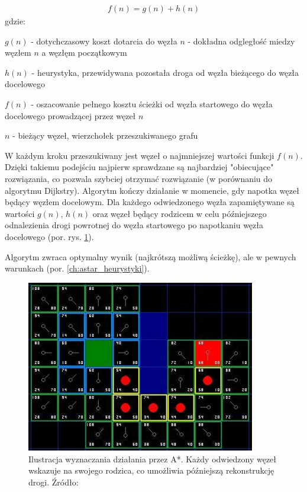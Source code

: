 \begin{gather}
 	f(n) = g(n) + h(n)
 	\label{eq_astar} 
\end{gather}
 gdzie:

 $g(n)$ - dotychczasowy koszt dotarcia do węzła $n$ - dokładna odgległość miedzy węzłem $n$ a węzłęm początkowym

 $h(n)$ - heurystyka, przewidywana pozostała droga od węzła bieżącego do węzła docelowego

 $f(n)$ - oszacowanie pełnego kosztu ścieżki od węzła startowego do węzła docelowego prowadzącej przez węzeł $n$

 $n$ - bieżący węzeł, wierzchołek przeszukiwanego grafu

W każdym kroku przeszukiwany jest węzeł o najmniejszej wartości funkcji $f(n)$.
Dzięki takiemu podejściu najpierw sprawdzane są najbardziej "obiecujące" rozwiązania, co pozwala szybciej otrzymać rozwiązanie (w porównaniu do algorytmu Dijkstry).
Algorytm kończy działanie w momencie, gdy napotka węzeł będący węzłem docelowym.
Dla każdego odwiedzonego węzła zapamiętywane są wartości $g(n)$, $h(n)$ oraz węzeł będący rodzicem w celu późniejszego odnalezienia drogi powrotnej do węzła startowego po napotkaniu węzła docelowego (por. rys. \ref{fig:image_astar2}).

Algorytm zwraca optymalny wynik (najkrótszą możliwą ścieżkę), ale w pewnych warunkach (por. \ref{ch:astar_heurystyki}).

\begin{figure}
	\centering
	\includegraphics[width=10cm]{img/astar-t7}
	\caption{Ilustracja wyznaczania działania przez A*. Każdy odwiedzony węzeł wskazuje na swojego rodzica, co umożliwia późniejszą rekonstrukcję drogi. Źródło: \cite{astar2}}
	\label{fig:image_astar2}
\end{figure}

